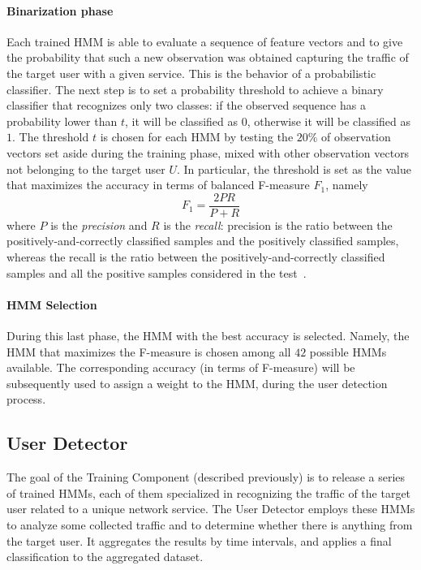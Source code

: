 \documentclass[10pt,conference,compsocconf,letterpaper]{IEEEtran}
\begin{document}
\paragraph{Binarization phase}
Each trained HMM is able to evaluate a sequence of feature vectors and
to give the probability that such a new observation was obtained
capturing the traffic of the target user with a given service. This is the
behavior of a probabilistic classifier. The next step is to set a
probability threshold to achieve a binary classifier that recognizes
only two classes: if the observed sequence has a probability lower
than $t$, it will be classified as $0$, otherwise it will be
classified as $1$. The threshold $t$ is chosen for each HMM by
testing the $20\%$ of observation vectors set aside during the training
phase, mixed with other observation vectors not belonging to the
target user $U$. In particular,  the threshold is set as the value that
maximizes the accuracy in terms of balanced F-measure $F_1$, namely
\[
F_1=\frac{2PR}{P+R}
\]
where $P$ is the \textit{precision} and $R$ is the \textit{recall}:
precision is the ratio between the positively-and-correctly classified
samples and the positively classified samples, whereas the recall is
the ratio between the positively-and-correctly classified samples and
all the positive samples considered in the test~\cite{Baeza-Yates:1999:MIR:553876}.


\paragraph{HMM Selection}
During this last phase, the HMM with the best accuracy is selected. 
Namely, the HMM that maximizes the F-measure is chosen 
among all $42$ possible HMMs available. The corresponding accuracy (in terms of F-measure) will be subsequently used to
assign a weight to the HMM, during the user detection process. 

\subsection{User Detector}
The goal of the Training Component (described previously) is to release a series of
trained HMMs, each of them specialized in recognizing the traffic
of the target user related to a unique network service. The User Detector employs 
these HMMs to analyze some collected traffic and to determine whether there is anything from the target user. 
It aggregates the results by time intervals, and
applies a final 
classification to the aggregated dataset. 
\end{document}
